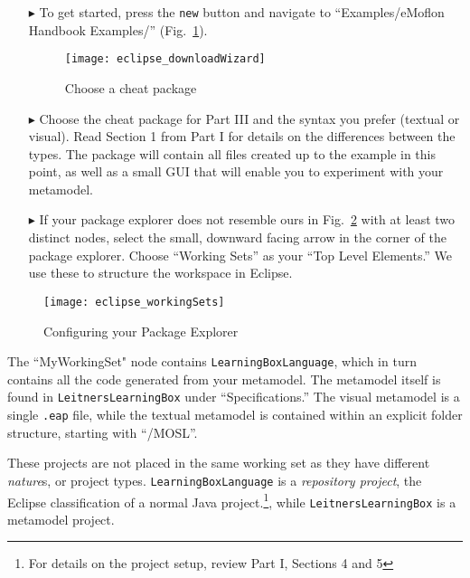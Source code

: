 \begin{itemize}

\item[$\blacktriangleright$] To get started, press the \texttt{new} button and navigate to ``Examples/eMoflon Handbook Examples/''
(Fig.~\ref{fig:downloadWizard}).

\begin{figure}[htbp]
	\centering
  \texttt{[image: eclipse\_downloadWizard]}
	\caption{Choose a cheat package}
	\label{fig:downloadWizard}
\end{figure}

\item[$\blacktriangleright$] Choose the cheat package for Part III and the syntax you prefer (textual or visual). Read Section 1 from Part I for details on
the differences between the types. The package will contain all files created up to the example in this point, as well as a small GUI that will enable you to
experiment with your metamodel.

\newpage

\vspace*{0.5cm}

\item[$\blacktriangleright$] If your package explorer does not resemble ours in Fig.~\ref{fig:workingSets} with at least two distinct nodes, select the
small, downward facing arrow in the corner of the package explorer. Choose ``Working Sets'' as your ``Top Level Elements.'' We use these to structure the
workspace in Eclipse.

\vspace{0.75cm}

\end{itemize}

\begin{figure}[htbp]
	\centering
  \texttt{[image: eclipse\_workingSets]}
	\caption{Configuring your Package Explorer}
	\label{fig:workingSets}
\end{figure}

The ``MyWorkingSet" node contains \texttt{Learn\-ing\-Box\-Lang\-uage}, which in turn contains all the code generated from your metamodel. The metamodel itself
is found in \texttt{Leit\-ners\-Learn\-ing\-Box} under ``Specifications.'' The visual metamodel is a single \texttt{.eap} file, while the textual metamodel is
contained within an explicit folder structure, starting with ``/MOSL''. 

These projects are not placed in the same working set as they have different \emph{nature}s, or project types. \texttt{Learning\-Box\-Language} is a
\emph{repository project}, the Eclipse classification of a normal Java project.\footnote{For details on the project setup, review Part I, Sections 4 and 5}, 
while \texttt{LeitnersLearningBox} is a metamodel project.

